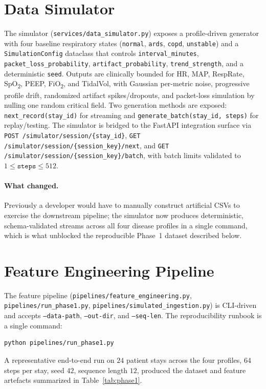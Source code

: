 \documentclass[12pt,a4paper,oneside]{report}
\begin{document}
\section{Data Simulator}
The simulator (\texttt{services/data\_simulator.py}) exposes a profile-driven generator with four baseline respiratory states (\texttt{normal}, \texttt{ards}, \texttt{copd}, \texttt{unstable}) and a \texttt{SimulationConfig} dataclass that controls \texttt{interval\_minutes}, \texttt{packet\_loss\_probability}, \texttt{artifact\_probability}, \texttt{trend\_strength}, and a deterministic \texttt{seed}. Outputs are clinically bounded for HR, MAP, RespRate, SpO\textsubscript{2}, PEEP, FiO\textsubscript{2}, and TidalVol, with Gaussian per-metric noise, progressive profile drift, randomized artifact spikes/dropouts, and packet-loss simulation by nulling one random critical field. Two generation methods are exposed: \texttt{next\_record(stay\_id)} for streaming and \texttt{generate\_batch(stay\_id, steps)} for replay/testing. The simulator is bridged to the FastAPI integration surface via \texttt{POST /simulator/session/\{stay\_id\}}, \texttt{GET /simulator/session/\{session\_key\}/next}, and \texttt{GET /simulator/session/\{session\_key\}/batch}, with batch limits validated to $1 \le \texttt{steps} \le 512$.

\paragraph{What changed.} Previously a developer would have to manually construct artificial CSVs to exercise the downstream pipeline; the simulator now produces deterministic, schema-validated streams across all four disease profiles in a single command, which is what unblocked the reproducible Phase~1 dataset described below.

\section{Feature Engineering Pipeline}
The feature pipeline (\texttt{pipelines/feature\_engineering.py}, \texttt{pipelines/run\_phase1.py}, \texttt{pipelines/simulated\_ingestion.py}) is CLI-driven and accepts \texttt{--data-path}, \texttt{--out-dir}, and \texttt{--seq-len}. The reproducibility runbook is a single command:

\begin{verbatim}
python pipelines/run_phase1.py
\end{verbatim}

A representative end-to-end run on $24$ patient stays across the four profiles, $64$ steps per stay, seed $42$, sequence length $12$, produced the dataset and feature artefacts summarized in Table~\ref{tab:phase1}.
\end{document}
